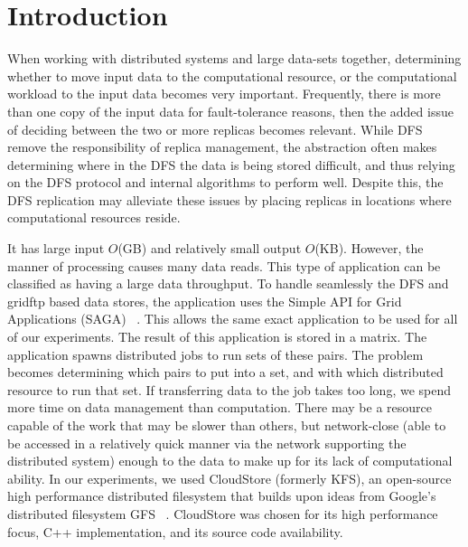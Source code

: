 \documentclass{rspublic}
\begin{document}
\section{Introduction} When working with distributed systems and large
data-sets together, determining whether to move input data to the
computational resource, or the computational workload to the input data
becomes very important. Frequently, there is more than one copy of the
input data for fault-tolerance reasons, then the added issue of deciding
between the two or more replicas becomes relevant. While DFS remove the
responsibility of replica management, the abstraction often makes
determining where in the DFS the data is being stored difficult, and
thus relying on the DFS protocol and internal algorithms to perform
well. Despite this, the DFS replication may alleviate these issues by
placing replicas in locations where computational resources reside.


It has large input $O$(GB) and relatively small output $O$(KB). However,
the manner of processing causes many data reads. This type of
application can be classified as having a large data throughput. To
handle seamlessly the DFS and gridftp based data stores, the application
uses the Simple API for Grid Applications (SAGA) ~\citep{saga_web}. This
allows the same exact application to be used for all of our experiments.
The result of this application is stored in a matrix. The application
spawns distributed jobs to run sets of these pairs.  The problem becomes
determining which pairs to put into a set, and with which distributed
resource to run that set. If transferring data to the job takes too
long, we spend more time on data management than computation. There may
be a resource capable of the work that may be slower than others, but
network-close (able to be accessed in a relatively quick manner via the
network supporting the distributed system) enough to the data to make up
for its lack of computational ability. In our experiments, we used
CloudStore (formerly KFS), an open-source high performance distributed
filesystem that builds upon ideas from Google's distributed filesystem
GFS ~\citep{kfs_web}.  CloudStore was chosen for its high performance
focus, C++ implementation, and its source code availability.
\end{document}
